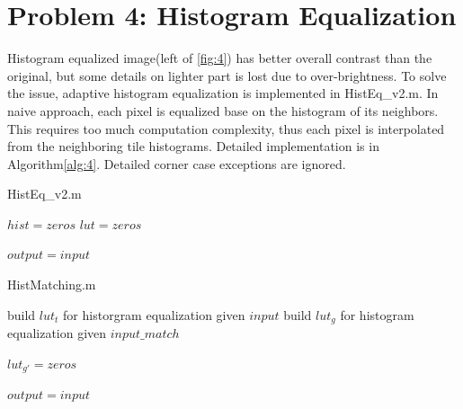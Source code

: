 \documentclass[extendedabs]{bmvc2k}
\begin{document}
\section*{Problem 4: Histogram Equalization}

Histogram equalized image(left of \figurename{\ref{fig:4}}) has better 
overall contrast than the original, but some details on lighter part 
is lost due to over-brightness.
To solve the issue, adaptive histogram equalization is implemented in
HistEq\_v2.m. In naive approach, each pixel is equalized base on the histogram
of its neighbors. This requires too much computation complexity, thus
each pixel is interpolated from the neighboring tile histograms.
Detailed implementation is in Algorithm\ref{alg:4}. Detailed corner case 
exceptions are ignored.

\begin{algorithm}
\caption{HistEq\_v2.m}
\label{alg:4}
$hist = zeros$\;
$lut = zeros$\;
        
$output = input$\;
\end{algorithm}

\begin{algorithm}
    \caption{HistMatching.m}
    \label{alg:5}
    build $lut_t$ for historgram equalization given $input$\;
    build $lut_g$ for histogram equalization given $input\_match$\;
    
    $lut_{g'} = zeros$\;
    
    $output = input$\;
    \end{algorithm}
\end{document}
